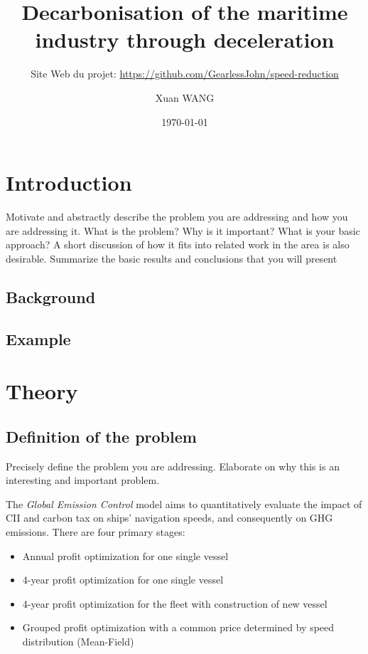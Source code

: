 \documentclass[a4paper,12pt]{article}
\author{Xuan WANG}
\date{\today}
\title{Decarbonisation of the maritime industry through deceleration}
\subtitle{Site Web du projet: \url{https://github.com/GearlessJohn/speed-reduction}}%
\begin{document}
\maketitle

\tableofcontents




\renewcommand{\thepage}{\arabic{page}}


\newpage
\setcounter{page}{1}
\section{Introduction}

Motivate and abstractly describe the problem you are addressing and how you are
addressing it. What is the problem? Why is it important? What is your basic approach? A
short discussion of how it fits into related work in the area is also desirable. Summarize the
basic results and conclusions that you will present
\subsection{Background}

\subsection{Example}



\section{Theory}

\subsection{Definition of the problem}
Precisely define the problem you are addressing. Elaborate on why this is an interesting and
important problem.

The \textit{Global Emission Control} model aims to quantitatively evaluate the impact of CII and carbon tax on ships' navigation speeds, and consequently on GHG emissions. There are four primary stages:
\begin{itemize}
	\item Annual profit optimization for one single vessel
	\item 4-year profit optimization for one single vessel
	\item 4-year profit optimization for the fleet with construction of new vessel
	\item Grouped profit optimization with a common price determined by speed distribution (Mean-Field) \\
\end{itemize}
\end{document}
